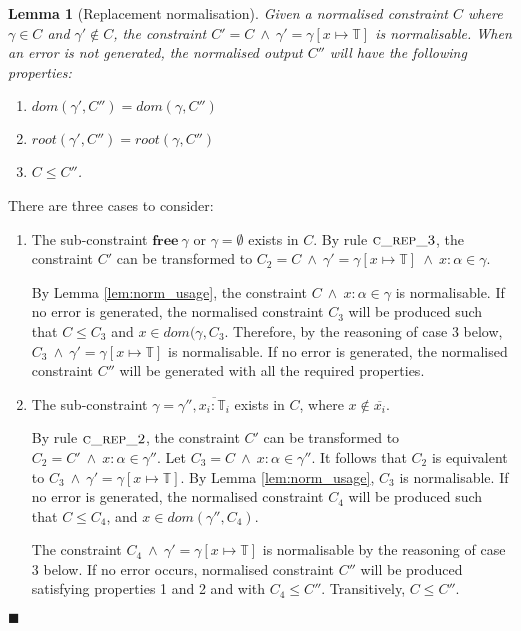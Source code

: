 \documentclass[preprint]{sigplanconf}
\newtheorem{lem}{Lemma}
\newcommand{\lemref}[1]{Lemma \ref{#1}}
\newcommand{\cand}{\:\wedge\:}
\newcommand{\free}[1]{\mathbf{free}\:#1}
\newcommand{\tinf}{\mathbb{T}}
\newcommand{\qed}{$\blacksquare$}
\newenvironment{proof}{\vspace{1ex}\noindent{\bf Proof}\hspace{0.5em}}
  {\hfill\qed\vspace{1ex}}
\begin{document}
\begin{lem}[Replacement normalisation]
\label{lem:norm_rep}
Given a normalised constraint $C$ where $\gamma \in C$ and $\gamma' \notin C$,
the constraint $C' = C \cand \gamma' = \gamma[x \mapsto \tinf]$ is normalisable. When
an error is not generated, the normalised output $C''$ will have the
following properties:

\begin{enumerate}
\item $dom(\gamma', C'') = dom(\gamma, C'')$
\item $root(\gamma', C'') = root(\gamma, C'')$
\item $C \leq C''$.
\end{enumerate}

\end{lem}
\begin{proof}

There are three cases to consider:

\begin{enumerate}

\item The sub-constraint $\free{\gamma}$ or $\gamma = \emptyset$ exists in
$C$. By rule $\textsc{c\_rep\_3}$, the constraint $C'$ can be transformed
to 
$C_2 = C \cand \gamma' = \gamma[x \mapsto \tinf] \cand x : \alpha \in \gamma$.

By \lemref{lem:norm_usage}, the constraint $C \cand x : \alpha \in \gamma$ is 
normalisable. If no
error is generated, the normalised constraint $C_3$ will be produced such
that $C \leq C_3$ and $x \in dom(\gamma, C_3$. Therefore, by the 
reasoning of case 3 below, $C_3 \cand \gamma' = \gamma[x \mapsto \tinf]$ is 
normalisable. If no error is generated, the normalised constraint $C''$ will 
be generated with all the required properties.

\item The sub-constraint $\gamma = \gamma'', \overline{x_i : \tinf_i}$ exists
in $C$, where $x \notin \overline{x_i}$.

By rule $\textsc{c\_rep\_2}$, the
constraint $C'$ can be transformed to $C_2 = C' \cand x : \alpha \in \gamma''$.
Let $C_3 = C \cand x : \alpha \in \gamma''$. It follows that
$C_2$ is equivalent to $C_3 \cand \gamma' = \gamma[x \mapsto \tinf]$. 
By \lemref{lem:norm_usage}, $C_3$ is normalisable. If no
error is generated, the normalised constraint $C_4$ will be produced such that
$C \leq C_4$, and $x \in dom(\gamma'', C_4)$.

The constraint $C_4 \cand \gamma' = \gamma[x \mapsto \tinf]$ is normalisable
by the reasoning of case 3 below. 
If no error occurs, normalised constraint $C''$ will be produced satisfying
properties 1 and 2 and with $C_4 \leq C''$. Transitively, $C \leq C''$.


\end{enumerate}
\end{proof}
\end{document}

